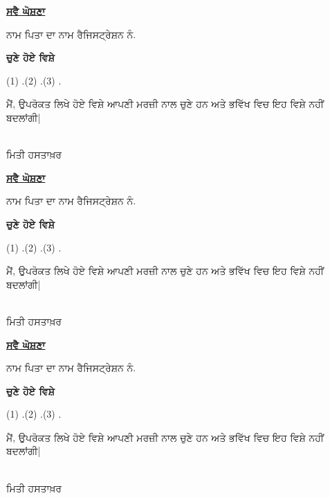 \documentclass[12pt]{article}
\begin{document}
\doublespacing
	\begin{center}
	{\large{\underline{\textbf{\punjabifont ਸਵੈ ਘੋਸ਼ਣਾ}}}}
\end{center}

	\punjabifont ਨਾਮ \dotfill ਪਿਤਾ ਦਾ ਨਾਮ \dotfill ਰੈਜਿਸਟ੍ਰੇਸ਼ਨ ਨੰ. \dotfill \\
	\centerline{\textbf{ਚੁਣੇ ਹੋਏ ਵਿਸ਼ੇ}}
	
	\vspace{0.3cm}
	(1) .\dotfill (2) .\dotfill (3) .\dotfill \\
	\centerline{ਮੈਂ, ਉਪਰੋਕਤ ਲਿਖੇ ਹੋਏ ਵਿਸ਼ੇ ਆਪਣੀ ਮਰਜ਼ੀ ਨਾਲ ਚੁਣੇ ਹਨ ਅਤੇ ਭਵਿੱਖ ਵਿਚ ਇਹ ਵਿਸ਼ੇ ਨਹੀਂ ਬਦਲਾਂਗੀ|} \\
	
	\vspace{0.5cm}
	ਮਿਤੀ \makebox[4cm]{\dotfill} \hspace{7cm} ਹਸਤਾਖ਼ਰ \makebox[4cm]{\dotfill}
	
\vspace{2cm}

	\begin{center}
	{\large{\underline{\textbf{\punjabifont ਸਵੈ ਘੋਸ਼ਣਾ}}}}
\end{center}

\punjabifont ਨਾਮ \dotfill ਪਿਤਾ ਦਾ ਨਾਮ \dotfill ਰੈਜਿਸਟ੍ਰੇਸ਼ਨ ਨੰ. \dotfill \\
\centerline{\textbf{ਚੁਣੇ ਹੋਏ ਵਿਸ਼ੇ}}

\vspace{0.3cm}
(1) .\dotfill (2) .\dotfill (3) .\dotfill \\
\centerline{ਮੈਂ, ਉਪਰੋਕਤ ਲਿਖੇ ਹੋਏ ਵਿਸ਼ੇ ਆਪਣੀ ਮਰਜ਼ੀ ਨਾਲ ਚੁਣੇ ਹਨ ਅਤੇ ਭਵਿੱਖ ਵਿਚ ਇਹ ਵਿਸ਼ੇ ਨਹੀਂ ਬਦਲਾਂਗੀ|} \\

\vspace{0.5cm}
ਮਿਤੀ \makebox[4cm]{\dotfill} \hspace{7cm} ਹਸਤਾਖ਼ਰ \makebox[4cm]{\dotfill}

\vspace{2cm}

	\begin{center}
	{\large{\underline{\textbf{\punjabifont ਸਵੈ ਘੋਸ਼ਣਾ}}}}
\end{center}

\punjabifont ਨਾਮ \dotfill ਪਿਤਾ ਦਾ ਨਾਮ \dotfill ਰੈਜਿਸਟ੍ਰੇਸ਼ਨ ਨੰ. \dotfill \\
\centerline{\textbf{ਚੁਣੇ ਹੋਏ ਵਿਸ਼ੇ}}

\vspace{0.3cm}
(1) .\dotfill (2) .\dotfill (3) .\dotfill \\
\centerline{ਮੈਂ, ਉਪਰੋਕਤ ਲਿਖੇ ਹੋਏ ਵਿਸ਼ੇ ਆਪਣੀ ਮਰਜ਼ੀ ਨਾਲ ਚੁਣੇ ਹਨ ਅਤੇ ਭਵਿੱਖ ਵਿਚ ਇਹ ਵਿਸ਼ੇ ਨਹੀਂ ਬਦਲਾਂਗੀ|} \\

\vspace{0.5cm}
ਮਿਤੀ \makebox[4cm]{\dotfill} \hspace{7cm} ਹਸਤਾਖ਼ਰ \makebox[4cm]{\dotfill}
\end{document}
